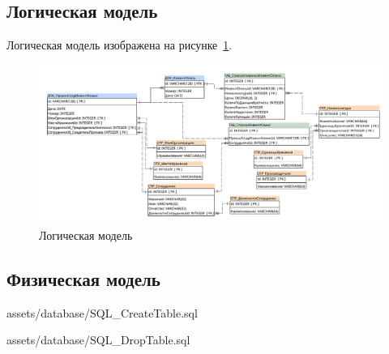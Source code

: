 \newpage
\subsection{Логическая модель}

Логическая модель 
изображена на рисунке~\ref{fig:ArchitectureDatabase}.

\begin{figure}[!h]
    \centering

    \includegraphics[width=18cm]
    {assets/database/ArchitectureDatabase.architect.pdf}

    \caption{Логическая модель}

    \label{fig:ArchitectureDatabase}
\end{figure}

\newpage
\subsection{Физическая модель}


{assets/database/SQL_CreateTable.sql}

\newpage


{assets/database/SQL_DropTable.sql}

\newpage
